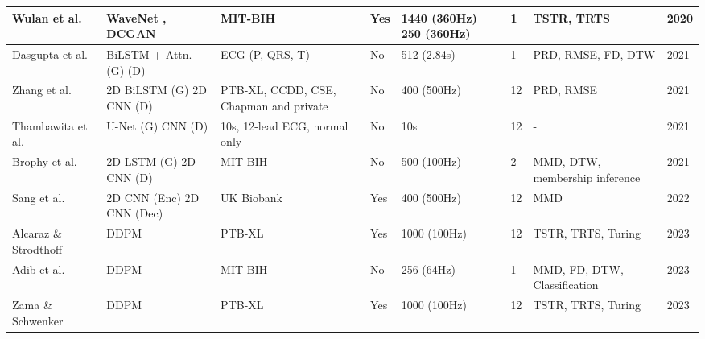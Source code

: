 \begin{table}[ht]
\begin{tabular}{|p{1.5cm}|p{2.3cm}|p{1.8cm}|p{1cm}|p{1.8cm}|p{1cm}|p{1.8cm}|p{0.7cm}|}
\hline
Wulan et al. \cite{wulan_generating_2020} & WaveNet \cite{oord_wavenet_2016}, DCGAN \cite{radford_unsupervised_2016} & MIT-BIH & Yes & 1440 (360Hz) 250 (360Hz) & 1 & TSTR, TRTS & 2020 \\
\hline
Dasgupta et al. \cite{dasgupta_cardiogan_2021} & BiLSTM + Attn. (G) (D) & ECG (P, QRS, T) & No & 512 (2.84s) & 1 & PRD, RMSE, FD, DTW & 2021 \\
\hline
Zhang et al. \cite{zhang_synthesis_2021} & 2D BiLSTM (G) 2D CNN (D) & PTB-XL, CCDD, CSE, Chapman and private & No & 400 (500Hz) & 12 & PRD, RMSE & 2021 \\
\hline
Thambawita et al. \cite{thambawita_deepfake_2021} & U-Net (G) CNN (D) & 10s, 12-lead ECG, normal only & No & 10s & 12 & - & 2021 \\
\hline
Brophy et al. \cite{brophy_multivariate_2021} & 2D LSTM (G) 2D CNN (D) & MIT-BIH & No & 500 (100Hz) & 2 & MMD, DTW, membership inference & 2021 \\
\hline
Sang et al. \cite{sang_generation_2022} & 2D CNN (Enc) 2D CNN (Dec) & UK Biobank & Yes & 400 (500Hz) & 12 & MMD & 2022 \\
\hline
Alcaraz \& Strodthoff \cite{alcaraz_diffusion-based_2023} & DDPM \cite{nichol_improved_2021} & PTB-XL & Yes & 1000 (100Hz) & 12 & TSTR, TRTS, Turing & 2023 \\
\hline
Adib et al. \cite{adib_synthetic_2023} & DDPM \cite{nichol_improved_2021} & MIT-BIH & No & 256 (64Hz) & 1 & MMD, FD, DTW, Classification & 2023 \\
\hline
Zama \& Schwenker \cite{zama_ecg_2023} & DDPM \cite{nichol_improved_2021} & PTB-XL & Yes & 1000 (100Hz) & 12 & TSTR, TRTS, Turing & 2023 \\
\hline
\end{tabular}
\end{table}




